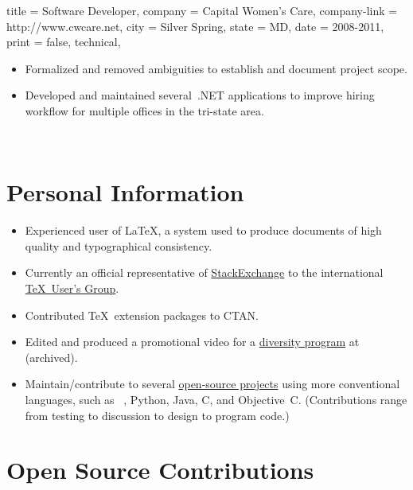 \documentclass{simplecv}
\newif\ifgithub
\begin{document}
\begin{position}
  {
    title   = Software Developer,
    company = Capital Women's Care,
    company-link = http://www.cwcare.net,
    city    = Silver Spring,
    state   = MD,
    date    = 2008-2011,
    print   = false,
    technical,
  }

\begin{itemize}
\item Formalized and removed ambiguities to establish and document project scope.
\item Developed and maintained several \CSharp\,.NET applications to
  improve hiring workflow for multiple offices in the tri-state area.
\end{itemize}
\end{position}

\vfill \vfill
\newpage~\vfill

\section{Personal Information}
\begin{itemize}
\item Experienced user of \LaTeX, a system used to produce documents
  of high quality and typographical consistency.
\item Currently an official representative of
  \href{http://meta.tex.stackexchange.com/a/4174/17423}{StackExchange}
  to the international \href{http://www.tug.org}{\TeX\ User's Group}.
\item Contributed \TeX\ extension packages to CTAN.
\item Edited and produced a promotional video for a \href{http://www.smcm.edu/desousabrent}{diversity program} at  (archived).
\item Maintain\slash contribute to several
  \href{http://www.github.com/vermiculus}{open-source projects}
  using more conventional languages, such as
  ~\Lisp, Python, Java, C, and Objective~C.
  (Contributions range from testing to discussion to design to program code.)
\end{itemize}

\ifgithub
\vfill
\section{Open Source Contributions \hfill {}}

\end{document}

